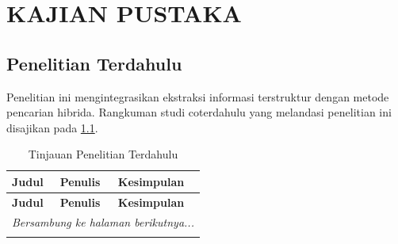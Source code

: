 \chapter{KAJIAN PUSTAKA}

\section{Penelitian Terdahulu}

Penelitian ini mengintegrasikan ekstraksi informasi terstruktur dengan metode pencarian hibrida. Rangkuman studi coterdahulu yang melandasi penelitian ini disajikan pada \ref{tab:penelitian_terdahulu_revisi}.

\renewcommand{\arraystretch}{1.3}
\begin{longtable}{|p{4cm}|p{2cm}|p{10cm}|}
    \caption{Tinjauan Penelitian Terdahulu} \label{tab:penelitian_terdahulu_revisi}                                                                                          \\

    \hline
    \textbf{Judul}                                                                                                                  & \textbf{Penulis} & \textbf{Kesimpulan} \\ \hline
    \endfirsthead

    \hline
    \textbf{Judul}                                                                                                                  & \textbf{Penulis} & \textbf{Kesimpulan} \\ \hline
    \endhead

    \hline
    \multicolumn{3}{r}{\textit{Bersambung ke halaman berikutnya...}}                                                                                                         \\
    \endfoot

    \hline
    \endlastfoot


\end{longtable}
